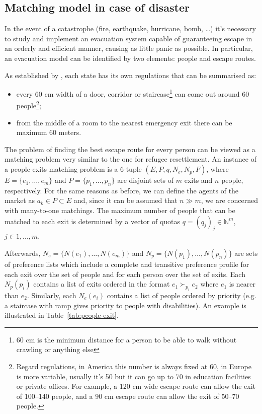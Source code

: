 \subsection{Matching model in case of disaster}\label{matching-model-in-case-of-disaster}%


In the event of a catastrophe (fire, earthquake, hurricane, bomb, \ldots) it's necessary to study and implement an evacuation system capable of guaranteeing escape in an orderly and efficient manner, causing as little panic as possible. In particular, an evacuation model can be identified by two elements: people and escape routes.

As established by \citet{it-81-2008,uk-1541-2005,usa-1910-1974,cee-654-1989}, each state has its own regulations that can be summarised as: 
\begin{itemize}
    \item every 60 cm width of a door, corridor or staircase\footnote{60 cm is the minimum distance for a person to be able to walk without crawling or anything else} can come out around 60 people\footnote{Regard regulations, in America this number is always fixed at 60, in Europe is more variable, usually it's 50 but it can go up to 70 in education facilities or private offices. For example, a 120 cm wide escape route can allow the exit of 100--140 people, and a 90 cm escape route can allow the exit of 50--70 people.};
    \item from the middle of a room to the nearest emergency exit there can be maximum 60 meters.
\end{itemize}

The problem of finding the best escape route for every person can be viewed as a matching problem very similar to the one for refugee resettlement. An instance of a people-exits matching problem is a 6-tuple \((E, P, q, N_e, N_p, F)\), where \(E = \{e_1, \dots, e_m\}\) and \(P = \{p_1, \dots, p_n\}\) are disjoint sets of \(m\) exits and \(n\) people, respectively.
For the same reasons as before, we can define the agents of the market as \(a_k \in P \subset E\) and, since it can be assumed that \(n \gg m\), we are concerned with many-to-one matchings.
The maximum number of people that can be matched to each exit is determined by a vector of quotas \(q = (q_j)_j \in \mathbb{N}^m\), \(j\in {1,...,m}\).

Afterwards, \(N_e = \{N(e_1), \dots, N(e_m)\}\) and \(N_p = \{ N(p_1), \dots, N(p_n)\}\) are sets of preference lists which include a complete and transitive preference profile for each exit over the set of people and for each person over
the set of exits. Each \(N_p(p_i)\) contains a list of exits ordered in the format \(e_1 \succ_{p_i} e_2\) where \(e_1\) is nearer than \(e_2\). Similarly, each \(N_e(e_i)\) contains a list of people ordered by priority (e.g. a staircase with ramp gives priority to people with disabilities). An example is illustrated in Table~\ref{tab:people-exit}.


